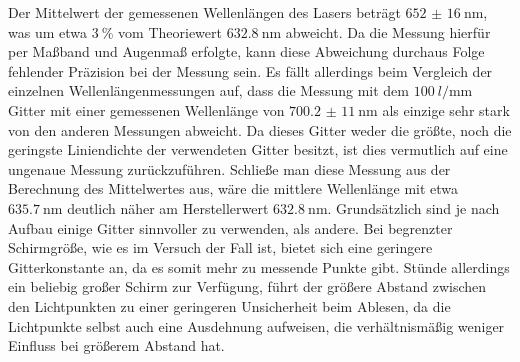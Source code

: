 Der Mittelwert der gemessenen Wellenlängen des Lasers beträgt $\SI{652(16)}{\nano\m}$, was um etwa $\SI{3}{\percent}$ vom Theoriewert $\SI{632.8}{\nano\m}$ 
abweicht. Da die Messung hierfür per Maßband und Augenmaß erfolgte, kann diese Abweichung durchaus Folge fehlender Präzision bei der Messung sein. 
Es fällt allerdings beim Vergleich der einzelnen Wellenlängenmessungen auf, dass die Messung mit dem $\SI{100}{l/\mm}$ Gitter mit einer gemessenen Wellenlänge 
von $\SI{700,2(11)}{\nano\m}$ als einzige sehr stark von den anderen Messungen abweicht. Da dieses Gitter weder die größte, noch die geringste Liniendichte der 
verwendeten Gitter besitzt, ist dies vermutlich auf eine ungenaue Messung zurückzuführen. Schließe man diese Messung aus der Berechnung des Mittelwertes aus, wäre 
die mittlere Wellenlänge mit etwa $\SI{635,7}{\nano\m}$ deutlich näher am Herstellerwert $\SI{632.8}{\nano\m}$. Grundsätzlich sind je nach Aufbau einige Gitter 
sinnvoller zu verwenden, als andere. Bei begrenzter Schirmgröße, wie es im Versuch der Fall ist, bietet sich eine geringere Gitterkonstante an, da es somit mehr 
zu messende Punkte gibt. Stünde allerdings ein beliebig großer Schirm zur Verfügung, führt der größere Abstand zwischen den Lichtpunkten zu einer geringeren Unsicherheit
beim Ablesen, da die Lichtpunkte selbst auch eine Ausdehnung aufweisen, die verhältnismäßig weniger Einfluss bei größerem Abstand hat. 